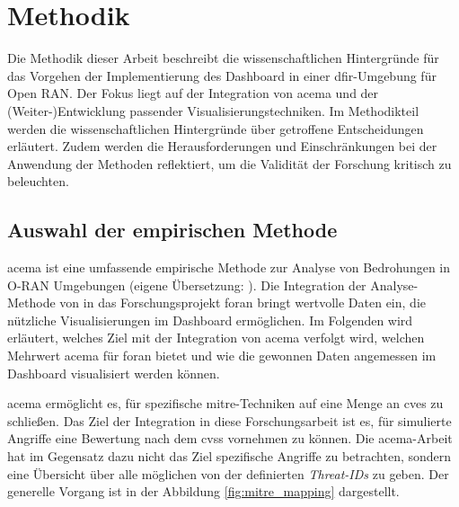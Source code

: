 \chapter{Methodik}
\label{chap:methodik}
Die Methodik dieser Arbeit beschreibt die wissenschaftlichen Hintergründe für das Vorgehen der Implementierung des Dashboard in einer \gls{dfir}-Umgebung für Open RAN. Der Fokus liegt auf der Integration von \gls{acema} und der (Weiter-)Entwicklung passender Visualisierungstechniken. Im Methodikteil werden die wissenschaftlichen Hintergründe über getroffene Entscheidungen erläutert. Zudem werden die Herausforderungen und Einschränkungen bei der Anwendung der Methoden reflektiert, um die Validität der Forschung kritisch zu beleuchten.
\section{Auswahl der empirischen Methode}
\label{sec:auswahlDerEmpirischenMethode}
\gls{acema} ist \glqq eine umfassende empirische Methode zur Analyse von Bedrohungen in O-RAN Umgebungen \grqq (eigene Übersetzung: \autocite{klementSecuring6GTransition2024}). Die Integration der Analyse-Methode von \citeauthor{klementSecuring6GTransition2024} in das Forschungsprojekt \gls{foran} bringt wertvolle Daten ein, die nützliche Visualisierungen im Dashboard ermöglichen. Im Folgenden wird erläutert, welches Ziel mit der Integration von \gls{acema} verfolgt wird, welchen Mehrwert \gls{acema} für \gls{foran} bietet und wie die gewonnen Daten angemessen im Dashboard visualisiert werden können.
\par \gls{acema} ermöglicht es, für spezifische \gls{mitre}-Techniken auf eine Menge an \glspl{cve} zu schließen. Das Ziel der Integration in diese Forschungsarbeit ist es, für simulierte Angriffe eine Bewertung nach dem \gls{cvss} vornehmen zu können. Die \gls{acema}-Arbeit hat im Gegensatz dazu nicht das Ziel spezifische Angriffe zu betrachten, sondern eine Übersicht über alle möglichen von der \oran definierten \textit{Threat-IDs} zu geben. Der generelle Vorgang ist in der Abbildung \ref{fig:mitre_mapping} dargestellt. 

